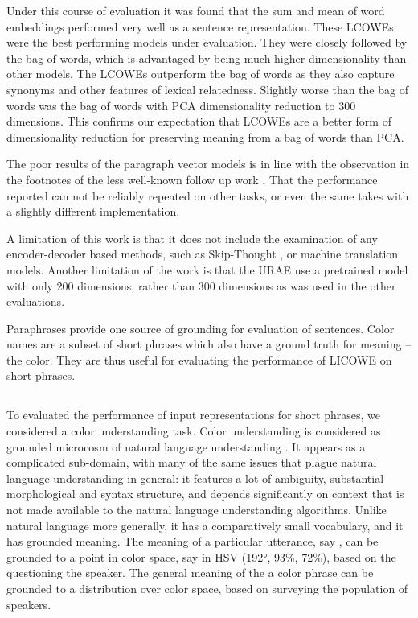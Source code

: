 \documentclass{book}
\begin{document}
Under this course of evaluation it was found that the sum and mean of word embeddings performed very well as a sentence representation.
These LCOWEs were the best performing models under evaluation.
They were closely followed by the bag of words, which is advantaged by being much higher dimensionality than other models.
The LCOWEs outperform the bag of words as they also capture  synonyms and other features of lexical relatedness.
Slightly worse than the bag of words was the bag of words with PCA dimensionality reduction to 300 dimensions.
This confirms our expectation that LCOWEs are a better form of dimensionality reduction for preserving meaning from a bag of words than PCA.



The poor results of the paragraph vector models \citep{le2014distributed} is in line with the observation in the footnotes of the less well-known follow up work \citet{mesnil2014ensemble}.
That the performance reported \citet{le2014distributed} can not be reliably repeated on other tasks, or even the same takes with a slightly different implementation.
 

A limitation of this work is that it does not include the examination of any encoder-decoder based methods, such as Skip-Thought \citep{DBLP:journals/corr/KirosZSZTUF15}, or machine translation models.
Another limitation of the work is that the URAE use a pretrained model with only 200 dimensions, rather than 300 dimensions as was used in the other evaluations.



Paraphrases provide one source of grounding for evaluation of sentences.
Color names are a subset of short phrases which also have a ground truth for meaning -- the color.
They are thus useful for evaluating the performance of LICOWE on short phrases.

\subsection{ }
To evaluated the performance of input representations for short phrases, we considered a color understanding task.
Color understanding is considered as grounded microcosm of natural language understanding \citep{2016arXiv160603821M}.
It appears as a complicated sub-domain, with many of the same issues that plague natural language understanding in general:
it features a lot of ambiguity, substantial morphological and syntax structure, and depends significantly on context that is not made available to the natural language understanding algorithms.
Unlike natural language more generally, it has a comparatively small vocabulary, and it has grounded meaning.
The meaning of a particular utterance, say , can be grounded to a point in color space, say in HSV (192°, 93\%, 72\%), based on the questioning the speaker.
The general meaning of the a color phrase can be grounded to a distribution over color space, based on surveying the population of speakers.
\end{document}
